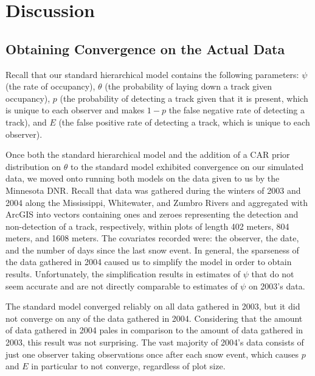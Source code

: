 \documentclass{article}
\begin{document}
\section{Discussion}

    \subsection{Obtaining Convergence on the Actual Data}
    Recall that our standard hierarchical model contains the following
    parameters: \(\psi\) (the rate of occupancy), \(\theta\) (the probability of
    laying down a track given occupancy), \(p\) (the probability of detecting a
    track given that it is present, which is unique to each observer and makes
    \(1-p\) the false negative rate of detecting a track), and \(E\) (the false
    positive rate of detecting a track, which is unique to each observer).

    Once both the standard hierarchical model and the addition of a CAR prior
    distribution on \(\theta\) to the standard model exhibited convergence on
    our simulated data, we moved onto running both models on the data given to
    us by the Minnesota DNR.  Recall that data was gathered during the winters
    of 2003 and 2004 along the Mississippi, Whitewater, and Zumbro Rivers and
    aggregated with ArcGIS into vectors containing ones and zeroes representing
    the detection and non-detection of a track, respectively, within plots of
    length 402 meters, 804 meters, and 1608 meters.  The covariates recorded
    were: the observer, the date, and the number of days since the last snow
    event.  In general, the sparseness of the data gathered in 2004 caused us to
    simplify the model in order to obtain results.  Unfortunately, the
    simplification results in estimates of \(\psi\) that do not seem accurate
    and are not directly comparable to estimates of \(\psi\) on 2003's data.

    The standard model converged reliably on all data gathered in 2003, but it
    did not converge on any of the data gathered in 2004.  Considering that the
    amount of data gathered in 2004 pales in comparison to the amount of data
    gathered in 2003, this result was not surprising.  The vast majority of
    2004's data consists of just one observer taking observations once after
    each snow event, which causes \(p\) and \(E\) in particular to not converge,
    regardless of plot size.
\end{document}
